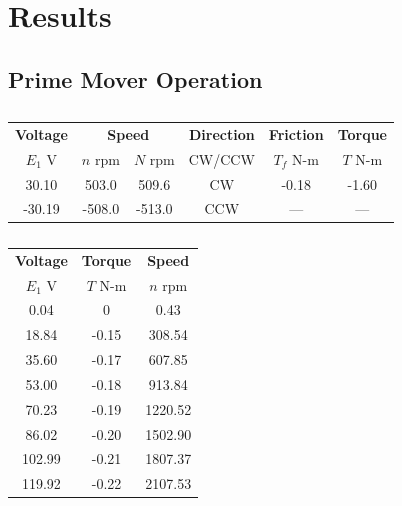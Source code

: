 \documentclass{article}
\begin{document}
\section{Results}

\subsection{Prime Mover Operation}

\begin{table}[H]
  \centering
  \begin{tabular}{*{6}{c}}
    \textbf{Voltage} & \multicolumn{2}{c}{\textbf{Speed}} & \textbf{Direction}
    & \textbf{Friction} & \textbf{Torque} \\
    $E_1$ V & $n$ rpm & $N$ rpm & CW/CCW & $T_f$ N-m & $T$ N-m \\
    \hline
     30.10 &  503.0 &  509.6 &  CW & -0.18 & -1.60 \\
    -30.19 & -508.0 & -513.0 & CCW &   --- &   --- \\
  \end{tabular}
  \caption{}
  \label{}
\end{table}

\begin{table}[H]
  \centering
  \begin{tabular}{*{3}{c}}
    \textbf{Voltage} & \textbf{Torque} & \textbf{Speed} \\
    $E_1$ V          & $T$ N-m         & $n$ rpm \\

    \hline

      0.04 &     0 &    0.43 \\
     18.84 & -0.15 &  308.54 \\
     35.60 & -0.17 &  607.85 \\
     53.00 & -0.18 &  913.84 \\
     70.23 & -0.19 & 1220.52 \\
     86.02 & -0.20 & 1502.90 \\
    102.99 & -0.21 & 1807.37 \\
    119.92 & -0.22 & 2107.53 \\
  \end{tabular}
  \caption{}
  \label{}
\end{table}
\end{document}
